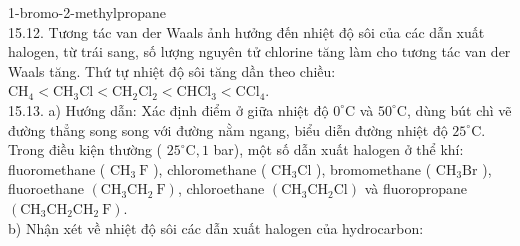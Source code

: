 \documentclass[10pt]{article}
\begin{document}
1-bromo-2-methylpropane\\
15.12. Tương tác van der Waals ảnh hưởng đến nhiệt độ sôi của các dẫn xuất halogen, từ trái sang, số lượng nguyên tử chlorine tăng làm cho tương tác van der Waals tăng. Thứ tự nhiệt độ sôi tăng dần theo chiều: $\mathrm{CH}_{4}<\mathrm{CH}_{3} \mathrm{Cl}<\mathrm{CH}_{2} \mathrm{Cl}_{2}<\mathrm{CHCl}_{3}<\mathrm{CCl}_{4}$.\\
15.13. a) Hướng dẫn: Xác định điểm ở giữa nhiệt độ $0^{\circ} \mathrm{C}$ và $50^{\circ} \mathrm{C}$, dùng bút chì vẽ đường thẳng song song với đường nằm ngang, biểu diễn đường nhiệt độ $25^{\circ} \mathrm{C}$.\\
Trong điều kiện thường ( $25^{\circ} \mathrm{C}, 1$ bar), một số dẫn xuất halogen ở thể khí: fluoromethane ( $\mathrm{CH}_{3} \mathrm{~F}$ ), chloromethane ( $\mathrm{CH}_{3} \mathrm{Cl}$ ), bromomethane ( $\mathrm{CH}_{3} \mathrm{Br}$ ), fluoroethane $\left(\mathrm{CH}_{3} \mathrm{CH}_{2} \mathrm{~F}\right)$, chloroethane $\left(\mathrm{CH}_{3} \mathrm{CH}_{2} \mathrm{Cl}\right)$ và fluoropropane $\left(\mathrm{CH}_{3} \mathrm{CH}_{2} \mathrm{CH}_{2} \mathrm{~F}\right)$.\\
b) Nhận xét về nhiệt độ sôi các dẫn xuất halogen của hydrocarbon:
\end{document}
